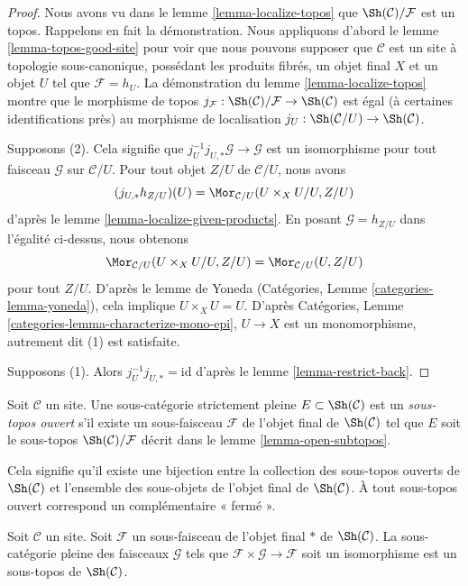 \begin{proof}
Nous avons vu dans le lemme \ref{lemma-localize-topos} que
$\Sh(\mathcal{C})/\mathcal{F}$ est un topos. Rappelons en fait la
démonstration. Nous appliquons d'abord le lemme \ref{lemma-topos-good-site}
pour voir que nous pouvons supposer que $\mathcal{C}$ est un site à topologie
sous-canonique, possédant les produits fibrés, un objet final $X$ et un objet $U$ tel que
$\mathcal{F} = h_U$. La démonstration du
lemme \ref{lemma-localize-topos}
montre que le morphisme de topos
$j_\mathcal{F} : \Sh(\mathcal{C})/\mathcal{F} \to \Sh(\mathcal{C})$
est égal (à certaines identifications près) au morphisme de localisation
$j_U : \Sh(\mathcal{C}/U) \to \Sh(\mathcal{C})$.

\medskip\noindent
Supposons (2). Cela signifie que $j_U^{-1}j_{U, *}\mathcal{G} \to \mathcal{G}$
est un isomorphisme pour tout faisceau $\mathcal{G}$ sur $\mathcal{C}/U$.
Pour tout objet $Z/U$ de $\mathcal{C}/U$, nous avons
$$
(j_{U, *}h_{Z/U})(U) = \Mor_{\mathcal{C}/U}(U \times_X U/U, Z/U)
$$
d'après le lemme \ref{lemma-localize-given-products}.
En posant $\mathcal{G} = h_{Z/U}$ dans l'égalité ci-dessus, nous obtenons
$$
\Mor_{\mathcal{C}/U}(U \times_X U/U, Z/U) = \Mor_{\mathcal{C}/U}(U, Z/U)
$$
pour tout $Z/U$. D'après le lemme de Yoneda
(Catégories, Lemme \ref{categories-lemma-yoneda}),
cela implique $U \times_X U = U$. D'après
Catégories, Lemme \ref{categories-lemma-characterize-mono-epi},
$U \to X$ est un monomorphisme, autrement dit (1) est satisfaite.

\medskip\noindent
Supposons (1). Alors $j_U^{-1} j_{U, *} = \text{id}$ d'après le
lemme \ref{lemma-restrict-back}.
\end{proof}

\begin{definition}
\label{definition-open-subtopos}
Soit $\mathcal{C}$ un site. Une sous-catégorie strictement pleine
$E \subset \Sh(\mathcal{C})$ est un {\it sous-topos ouvert}
s'il existe un sous-faisceau $\mathcal{F}$ de l'objet final
de $\Sh(\mathcal{C})$ tel que $E$ soit le sous-topos
$\Sh(\mathcal{C})/\mathcal{F}$ décrit dans le lemme \ref{lemma-open-subtopos}.
\end{definition}

\noindent
Cela signifie qu'il existe une bijection entre la collection des sous-topos ouverts
de $\Sh(\mathcal{C})$ et l'ensemble des sous-objets de l'objet final de
$\Sh(\mathcal{C})$. À tout sous-topos ouvert correspond un complémentaire « fermé ».

\begin{lemma}
\label{lemma-closed-subtopos}
Soit $\mathcal{C}$ un site. Soit $\mathcal{F}$ un sous-faisceau de l'objet final
$*$ de $\Sh(\mathcal{C})$. La sous-catégorie pleine des faisceaux
$\mathcal{G}$ tels que $\mathcal{F} \times \mathcal{G} \to \mathcal{F}$
soit un isomorphisme est un sous-topos de $\Sh(\mathcal{C})$.
\end{lemma}

